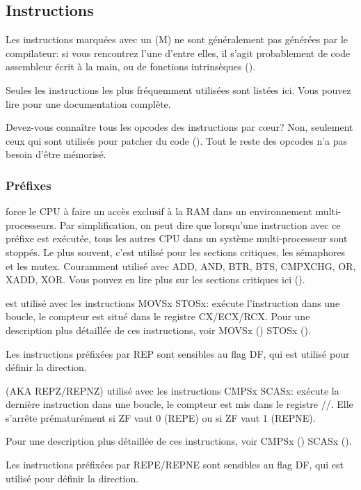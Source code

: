 \subsection{Instructions}
\label{sec:x86_instructions}

Les instructions marquées avec un (M) ne sont généralement pas générées par le compilateur:
si vous rencontrez l'une d'entre elles, il s'agit probablement de code assembleur
écrit à la main, ou de fonctions intrinsèques ().


Seules les instructions les plus fréquemment utilisées sont listées ici.
Vous pouvez lire  pour une documentation complète.

Devez-vous connaître tous les opcodes des instructions par c\oe{}ur?
Non, seulement ceux qui sont utilisés pour patcher du code
().
Tout le reste des opcodes n'a pas besoin d'être mémorisé.

\subsubsection{Préfixes}

\begin{description}
\label{x86_lock}
\item[LOCK] force le CPU à faire un accès exclusif à la RAM dans un environnement multi-processeurs.
Par simplification, on peut dire que lorsqu'une instruction avec ce préfixe est exécutée,
tous les autres CPU dans un système multi-processeur sont stoppés.
Le plus souvent, c'est utilisé pour les sections critiques, les sémaphores et les mutex.
Couramment utilisé avec ADD, AND, BTR, BTS, CMPXCHG, OR, XADD, XOR.
Vous pouvez en lire plus sur les sections critiques ici ().

\item[REP] est utilisé avec les instructions MOVSx \AndENRU STOSx:
exécute l'instruction dans une boucle, le compteur est situé dans le registre CX/ECX/RCX.
Pour une description plus détaillée de ces instructions, voir MOVSx ()
\AndENRU STOSx ().

Les instructions préfixées par REP sont sensibles au flag DF, qui est utilisé pour définir la direction.

\item[REPE/REPNE] (\ac{AKA} REPZ/REPNZ) utilisé avec les instructions CMPSx \AndENRU SCASx:
exécute la dernière instruction dans une boucle, le compteur est mis dans le registre //.
Elle s'arrête prématurément si ZF vaut 0 (REPE) ou si ZF vaut 1 (REPNE).

Pour une description plus détaillée de ces instructions, voir CMPSx ()
\AndENRU SCASx ().

Les instructions préfixées par REPE/REPNE sont sensibles au flag DF, qui est utilisé pour définir la direction.

\end{description}

